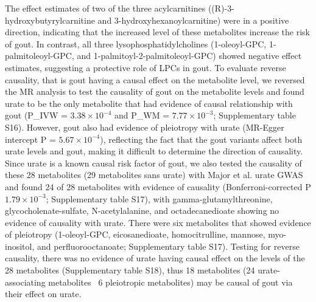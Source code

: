 \documentclass[gucdd,article,submit,pdftex,moreauthors]{Definitions/mdpi}
\begin{document}
The effect estimates of two of the three acylcarnitines ((R)-3-hydroxy\-butyryl\-carnitine and 3-hydroxy\-hexanoyl\-carnitine) were in a positive direction, indicating that the increased level of these metabolites increase the risk of gout.
In contrast, all three lysophosphatidylcholines (1-oleoyl-GPC, 1-palmitoleoyl-GPC, and 1-palmitoyl-2-palmitoleoyl-GPC) showed negative effect estimates, suggesting a protective role of LPCs in gout.
To evaluate reverse causality, that is gout having a causal effect on the metabolite level, we reversed the MR analysis to test the causality of gout on the metabolite levels and found urate to be the only metabolite that had evidence of causal relationship with gout (P_{IVW} = $3.38\times10^{-4}$ and P_{WM} = $7.77\times10^{-3}$; Supplementary table S16).
However, gout also had evidence of pleiotropy with urate (MR-Egger intercept P = $5.67\times10^{-4}$), reflecting the fact that the gout variants affect both urate levels and gout, making it difficult to determine the direction of causality.
Since urate is a known causal risk factor of gout, we also tested the causality of these 28 metabolites (29 metabolites sans urate) with Major et al. \citep{major_genome-wide_2024} urate GWAS and found 24 of 28 metabolites with evidence of causality (Bonferroni-corrected P \le $1.79\times10^{-3}$; Supplementary table S17), with gamma-glutamylthreonine, glycocholenate-sulfate, N-acetylalanine, and octadecanedioate showing no evidence of causality with urate.
There were six metabolites that showed evidence of pleiotropy (1-oleoyl-GPC, eicosanedioate, homocitrulline, mannose, myo-inositol, and perfluorooctanoate; Supplementary table S17).
Testing for reverse causality, there was no evidence of urate having causal effect on the levels of the 28 metabolites (Supplementary table S18), thus 18 metabolites (24 urate-associating metabolites \textminus\ 6 pleiotropic metabolites) may be causal of gout via their effect on urate.
\end{document}
